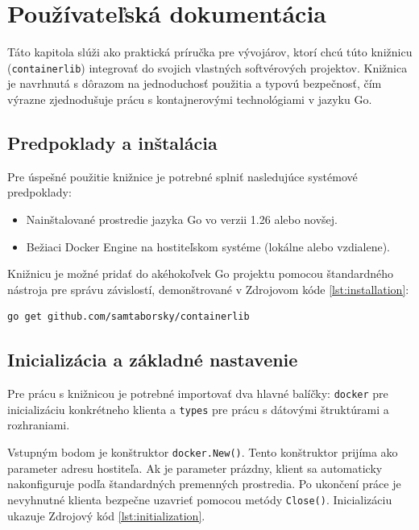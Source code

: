 \documentclass[
 program=infpvs,
  language=slovak,
  figures=false,
  tables=false,
  sourcecodes,
  glossaries,
  index
]{kidiplom}
\begin{document}
{\section{Používateľská dokumentácia}  \label{sec:dokumentacia}
Táto kapitola slúži ako praktická príručka pre vývojárov, ktorí chcú túto knižnicu (\texttt{containerlib}) integrovať do svojich vlastných softvérových projektov. Knižnica je navrhnutá s dôrazom na jednoduchosť použitia a typovú bezpečnosť, čím výrazne zjednodušuje prácu s kontajnerovými technológiami v jazyku Go.



\subsection{Predpoklady a inštalácia}  \label{sec:docs-instalacia}
Pre úspešné použitie knižnice je potrebné splniť nasledujúce systémové predpoklady:
\begin{itemize}
    \item Nainštalované prostredie jazyka Go vo verzii 1.26 alebo novšej.
    \item Bežiaci Docker Engine na hostiteľskom systéme (lokálne alebo vzdialene).
\end{itemize}

Knižnicu je možné pridať do akéhokoľvek Go projektu pomocou štandardného nástroja pre správu závislostí, demonštrované v Zdrojovom kóde \ref{lst:installation}:

\begin{lstlisting}[language=bash, caption={Inštalácia knižnice.}, label={lst:installation}]
go get github.com/samtaborsky/containerlib
\end{lstlisting}



\subsection{Inicializácia a základné nastavenie}  \label{sec:docs-inicializacia}
Pre prácu s knižnicou je potrebné importovať dva hlavné balíčky: \texttt{docker} pre inicializáciu konkrétneho klienta a \texttt{types} pre prácu s dátovými štruktúrami a rozhraniami.

Vstupným bodom je konštruktor \texttt{docker.New()}. Tento konštruktor prijíma ako parameter adresu hostiteľa. Ak je parameter prázdny, klient sa automaticky nakonfiguruje podľa štandardných premenných prostredia. Po ukončení práce je nevyhnutné klienta bezpečne uzavrieť pomocou metódy \texttt{Close()}. Inicializáciu ukazuje Zdrojový kód \ref{lst:initialization}.

}
\end{document}

